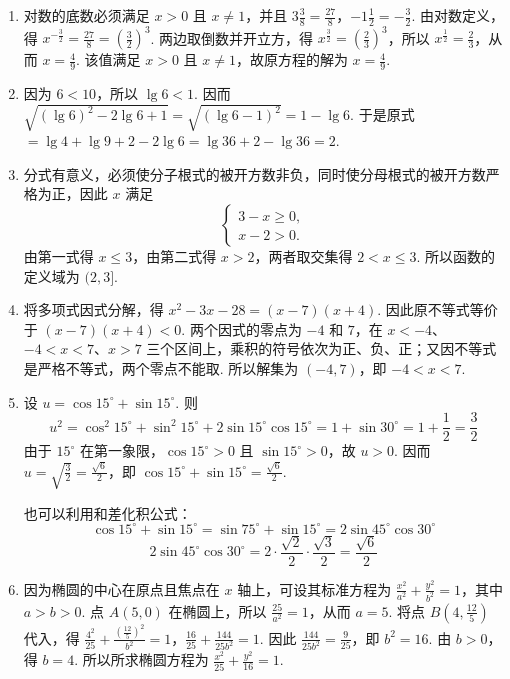 \begin{solution}
\begin{enumerate}
\item 对数的底数必须满足 \(x>0\) 且 \(x\ne1\)，并且
\(3\frac{3}{8}=\frac{27}{8}\)，\(-1\frac{1}{2}=-\frac{3}{2}\). 由对数定义，得
\(x^{-\frac{3}{2}}=\frac{27}{8}=\left(\frac{3}{2}\right)^3\). 两边取倒数并开立方，得 \(x^{\frac{3}{2}}=\left(\frac{2}{3}\right)^3\)，所以 \(x^{\frac{1}{2}}=\frac{2}{3}\)，从而 \(x=\frac{4}{9}\). 该值满足 \(x>0\) 且 \(x\ne1\)，故原方程的解为 \(x=\frac{4}{9}\).

\item 因为 \(6<10\)，所以 \(\lg 6<1\). 因而
\(\sqrt{\left(\lg 6\right)^2-2\lg 6+1}=\sqrt{\left(\lg 6-1\right)^2}=1-\lg 6\). 于是原式
\(=\lg 4+\lg 9+2-2\lg 6=\lg 36+2-\lg 36=2\).

\item 分式有意义，必须使分子根式的被开方数非负，同时使分母根式的被开方数严格为正，因此 \(x\) 满足
\[
\begin{cases}
3-x\ge0,\\
x-2>0.
\end{cases}
\]
由第一式得 \(x\le3\)，由第二式得 \(x>2\)，两者取交集得 \(2<x\le3\). 所以函数的定义域为 \((2,3]\).

\item 将多项式因式分解，得
\(x^2-3x-28=(x-7)(x+4)\). 因此原不等式等价于 \((x-7)(x+4)<0\). 两个因式的零点为 \(-4\) 和 \(7\)，在 \(x<-4\)、\(-4<x<7\)、\(x>7\) 三个区间上，乘积的符号依次为正、负、正；又因不等式是严格不等式，两个零点不能取. 所以解集为 \((-4,7)\)，即 \(-4<x<7\).

\item 设 \(u=\cos15^\circ+\sin15^\circ\). 则
\[
u^2=\cos^2 15^\circ+\sin^2 15^\circ+2\sin15^\circ\cos15^\circ
=1+\sin30^\circ=1+\frac12=\frac32
\]
由于 \(15^\circ\) 在第一象限，\(\cos15^\circ>0\) 且 \(\sin15^\circ>0\)，故 \(u>0\). 因而 \(u=\sqrt{\frac32}=\frac{\sqrt6}{2}\)，即
\(\cos15^\circ+\sin15^\circ=\frac{\sqrt6}{2}\).

也可以利用和差化积公式：
\[
\cos15^\circ+\sin15^\circ=\sin75^\circ+\sin15^\circ
=2\sin45^\circ\cos30^\circ
\]
\[
2\sin45^\circ\cos30^\circ
=2\cdot\frac{\sqrt2}{2}\cdot\frac{\sqrt3}{2}
=\frac{\sqrt6}{2}
\]

\item 因为椭圆的中心在原点且焦点在 \(x\) 轴上，可设其标准方程为
\(\frac{x^2}{a^2}+\frac{y^2}{b^2}=1\)，其中 \(a>b>0\). 点 \(A(5,0)\) 在椭圆上，所以
\(\frac{25}{a^2}=1\)，从而 \(a=5\). 将点 \(B\left(4,\frac{12}{5}\right)\) 代入，得
\(\frac{4^2}{25}+\frac{\left(\frac{12}{5}\right)^2}{b^2}=1\)，\(\frac{16}{25}+\frac{144}{25b^2}=1\).
因此 \(\frac{144}{25b^2}=\frac9{25}\)，即 \(b^2=16\). 由 \(b>0\)，得 \(b=4\). 所以所求椭圆方程为
\(\frac{x^2}{25}+\frac{y^2}{16}=1\).
\end{enumerate}
\end{solution}

